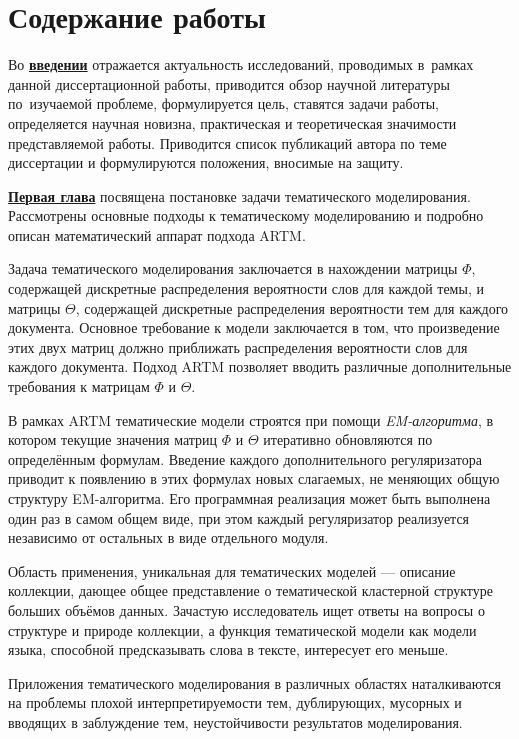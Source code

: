 \section*{Содержание работы}
Во \underline{\textbf{введении}} отражается актуальность
исследований, проводимых в~рамках данной диссертационной работы,
приводится обзор научной литературы по~изучаемой проблеме,
формулируется цель, ставятся задачи работы, определяется научная новизна, практическая и теоретическая значимости представляемой работы. Приводится список публикаций автора по теме диссертации и формулируются положения, вносимые на защиту.

\underline{\textbf{Первая глава}} посвящена постановке задачи тематического моделирования. Рассмотрены основные подходы к тематическому моделированию и подробно описан математический аппарат подхода ARTM.

Задача тематического моделирования заключается в нахождении матрицы $\Phi$, содержащей дискретные распределения вероятности слов для каждой темы, и матрицы $\Theta$, содержащей дискретные распределения вероятности тем для каждого документа. Основное требование к модели заключается в том, что произведение этих двух матриц должно приближать распределения вероятности слов для каждого документа. Подход ARTM позволяет вводить различные дополнительные требования к матрицам $\Phi$ и $\Theta$.

В рамках ARTM тематические модели строятся при помощи \textit{EM-алгоритма}, в котором текущие значения матриц $\Phi$ и $\Theta$ итеративно обновляются по определённым формулам. Введение каждого дополнительного регуляризатора приводит к появлению в этих формулах новых слагаемых, не меняющих общую структуру EM-алгоритма. Его программная реализация может быть выполнена один раз в самом общем виде, при этом каждый регуляризатор реализуется независимо от остальных в виде отдельного модуля.

Область применения, уникальная для тематических моделей --- описание коллекции, дающее общее представление о тематической кластерной структуре больших объёмов данных. Зачастую исследователь ищет ответы на вопросы о структуре и природе коллекции, а функция тематической модели как модели языка, способной предсказывать слова в тексте, интересует его меньше.

Приложения тематического моделирования в различных областях наталкиваются на проблемы плохой интерпретируемости тем, дублирующих, мусорных и вводящих в заблуждение тем, неустойчивости результатов моделирования. 

